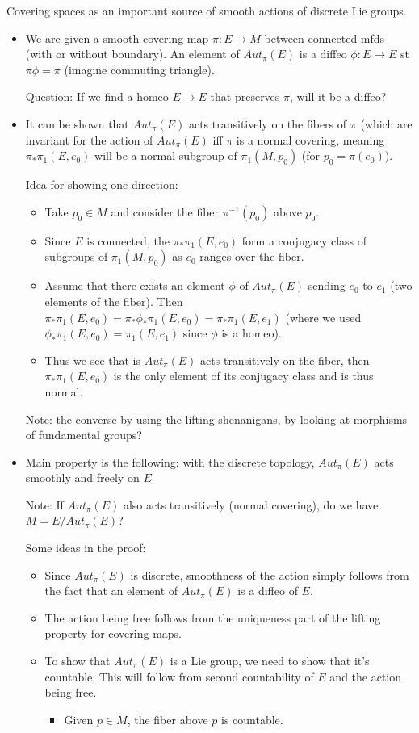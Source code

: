 \documentclass{report}
\theoremstyle{definition}
\begin{document}
Covering spaces as an important source of smooth actions of discrete Lie groups.

\begin{itemize}
    \item We are given a smooth covering map $\pi:E\to M$ between connected mfds (with or without boundary). An element of $Aut_\pi(E)$ is a diffeo $\phi:E\to E$ st $\pi\phi=\pi$ (imagine commuting triangle).

    Question: If we find a homeo $E\to E$ that preserves $\pi$, will it be a diffeo?
    \item It can be shown that $Aut_\pi(E)$ acts transitively on the fibers of $\pi$ (which are invariant for the action of $Aut_\pi(E)$ iff $\pi$ is a normal covering, meaning $\pi_*\pi_1(E,e_0)$ will be a normal subgroup of $\pi_1(M,p_0)$ (for $p_0=\pi(e_0)$).

    Idea for showing one direction:
    \begin{itemize}
        \item Take $p_0\in M$ and consider the fiber $\pi^{-1}(p_0)$ above $p_0$.
        \item Since $E$ is connected, the $\pi_*\pi_1(E,e_0)$ form a conjugacy class of subgroups of $\pi_1(M,p_0)$ as $e_0$ ranges over the fiber.
        \item Assume that there exists an element $\phi$ of $Aut_\pi(E)$ sending $e_0$ to $e_1$ (two elements of the fiber). Then $\pi_*\pi_1(E,e_0)=\pi_*\phi_*\pi_1(E,e_0)=\pi_*\pi_1(E,e_1)$ (where we used $\phi_*\pi_1(E,e_0)=\pi_1(E,e_1)$ since $\phi$ is a homeo).
        \item Thus we see that is $Aut_\pi(E)$ acts transitively on the fiber, then $\pi_*\pi_1(E,e_0)$ is the only element of its conjugacy class and is thus normal.
    \end{itemize}

    Note: the converse by using the lifting shenanigans, by looking at morphisms of fundamental groups?

    \item Main property is the following: with the discrete topology, $Aut_\pi(E)$ acts smoothly and freely on $E$

    Note: If $Aut_\pi(E)$ also acts transitively (normal covering), do we have $M=E/Aut_\pi(E)$?

    Some ideas in the proof:
    \begin{itemize}
        \item Since $Aut_\pi(E)$ is discrete, smoothness of the action simply follows from the fact that an element of $Aut_\pi(E)$ is a diffeo of $E$.
        \item The action being free follows from the uniqueness part of the lifting property for covering maps.
        \item To show that $Aut_\pi(E)$ is a Lie group, we need to show that it's countable. This will follow from second countability of $E$ and the action being free.
        \begin{itemize}
            \item Given $p\in M$, the fiber above $p$ is countable.


\end{itemize}
\end{itemize}
\end{itemize}
\end{document}
